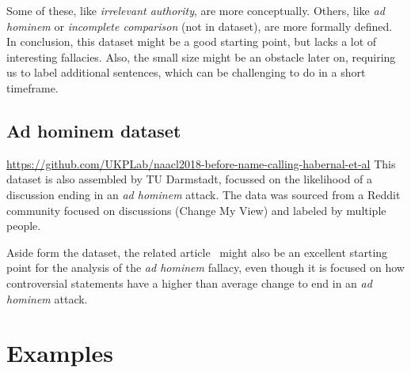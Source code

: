 \documentclass[a4paper]{article}
\begin{document}
Some of these, like \emph{irrelevant authority}, are more conceptually. Others, like \emph{ad hominem} or \emph{incomplete comparison} (not in dataset), are more formally defined. In conclusion, this dataset might be a good starting point, but lacks a lot of interesting fallacies. Also, the small size might be an obstacle later on, requiring us to label additional sentences, which can be challenging to do in a short timeframe. 

\subsection{Ad hominem dataset~\cite{Habernal.et.al.2018.NAACL.adhominem}}
\url{https://github.com/UKPLab/naacl2018-before-name-calling-habernal-et-al}
This dataset is also assembled by TU Darmstadt, focussed on the likelihood of a discussion ending in an \emph{ad hominem} attack. The data was sourced from a Reddit community focused on discussions (Change My View) and labeled by multiple people.  

Aside form the dataset, the related article~\cite{Habernal.et.al.2018.NAACL.adhominem} might also be an excellent starting point for the analysis of the \emph{ad hominem} fallacy, even though it is focused on how controversial statements have a higher than average change to end in an \emph{ad hominem} attack.
\section{Examples}
\end{document}
